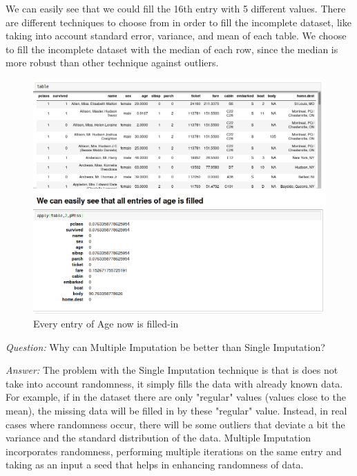 \documentclass[a4paper]{article}
\begin{document}
\newpage
We can easily see that we could fill the 16th entry with 5 different values. There are different techniques to choose from in order to fill the incomplete dataset, like taking into account standard error, variance, and mean of each table. We choose to fill the incomplete dataset with the median of each row, since the median is more robust than other technique against outliers.
\begin{figure}[htbp]
\centering
\includegraphics[width = \textwidth]{images/R4.png}
\caption{Every entry of Age now is filled-in}
\end{figure}

\par\noindent \textit{Question: } Why can Multiple Imputation be better than Single Imputation?
\par\noindent \textit{Answer: }  The problem with the Single Imputation technique is that is does not take into account randomness, it simply fills the data with already known data. For example, if in the dataset there are only "regular" values (values close to the mean), the missing data will be filled in by these "regular" value. Instead, in real cases where randomness occur, there will be some outliers that deviate a bit the variance and the standard distribution of the data. Multiple Imputation incorporates randomness, performing multiple iterations on the same entry and taking as an input a seed that helps in enhancing randomness of data.
\end{document}
